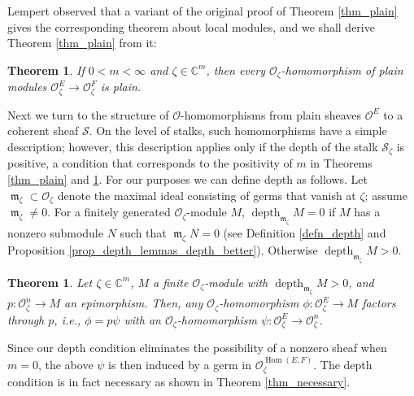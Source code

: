 \documentclass{amsart}
\numberwithin{equation}{section}
\theoremstyle{definition}
\theoremstyle{plain}
\newtheorem{theorem}[definition]{Theorem}
\theoremstyle{remark}
\begin{document}
Lempert observed that a variant of the original proof
of Theorem \ref{thm_plain} gives the corresponding theorem about
local modules, and we shall derive Theorem \ref{thm_plain} from it:
\begin{theorem}\label{thm_local_modules}
If $0<m<\infty$ and $\zeta\in\mathbb{C}^m$, then every
${\ensuremath{\mathcal{{O}}}}_\zeta$-homomorphism of plain modules 
${\ensuremath{\mathcal{{O}}}}^E_\zeta\rightarrow{\ensuremath{\mathcal{{O}}}}^F_\zeta$ is plain.
\end{theorem}

Next we turn to the structure of {\ensuremath{\mathcal{{O}}}}-homomorphisms from plain
sheaves ${\ensuremath{\mathcal{{O}}}}^E$ to a coherent sheaf ${\ensuremath{\mathcal{{S}}}}$.
On the level of stalks, such homomorphisms have a simple description;
however, this description applies only if the depth of the stalk 
${\ensuremath{\mathcal{{S}}}}_\zeta$ is positive, a condition that corresponds to the
positivity of $m$ in Theorems \ref{thm_plain} and \ref{thm_local_modules}.
For our purposes we can define depth as follows.
Let ${{\mathop{\mathfrak{m}}}}_\zeta\subset{\ensuremath{\mathcal{{O}}}}_\zeta$ denote the maximal
ideal consisting of germs that vanish at $\zeta$; assume ${{\mathop{\mathfrak{m}}}}_\zeta\not=0$. For a finitely generated
${\ensuremath{\mathcal{{O}}}}_\zeta$-module $M$, ${\mathop{\mathrm{depth}}\nolimits _{{{{\mathop{\mathfrak{m}}}}_\zeta}}} M=0$ if
$M$ has a nonzero submodule $N$ such that ${{\mathop{\mathfrak{m}}}}_\zeta N=0$
(see Definition \ref{defn_depth} and Proposition 
\ref{prop_depth_lemmas_depth_better}).
Otherwise ${\mathop{\mathrm{depth}}\nolimits _{{{{\mathop{\mathfrak{m}}}}_\zeta}}} M>0$.
\begin{theorem}\label{thm_coh_stalk}
Let $\zeta\in\mathbb{C}^m$, $M$ a finite ${\ensuremath{\mathcal{{O}}}}_\zeta$-module
with ${\mathop{\mathrm{depth}}\nolimits _{{{{\mathop{\mathfrak{m}}}}_\zeta}}} M>0$, and $p:{\ensuremath{\mathcal{{O}}}}^n_\zeta\rightarrow M$
an epimorphism. Then, any ${\ensuremath{\mathcal{{O}}}}_\zeta$-homomorphism
$\phi:{\ensuremath{\mathcal{{O}}}}_\zeta^E\rightarrow M$ factors through $p$, i.e., $\phi=p\psi$
with an ${\ensuremath{\mathcal{{O}}}}_\zeta$-homomorphism $\psi:{\ensuremath{\mathcal{{O}}}}_\zeta^E\rightarrow {\ensuremath{\mathcal{{O}}}}^n_\zeta$.
\end{theorem}
Since our depth condition eliminates the possibility of a nonzero sheaf when $m=0$, the above  $\psi$
is then induced by a germ in ${\ensuremath{\mathcal{{O}}}}_\zeta^{{{\mathop{\mathrm{Hom}}}}(E,F)}$.
The depth condition is in fact necessary as shown in Theorem 
\ref{thm_necessary}.
\end{document}
